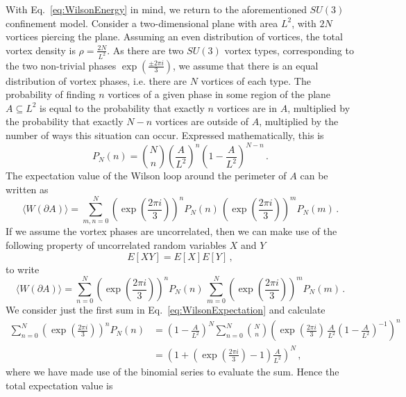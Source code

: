 With Eq.~\ref{eq:WilsonEnergy} in mind, we return to the aforementioned $SU(3)$ confinement model. Consider a two-dimensional plane with area $L^2$, with $2N$ vortices piercing the plane. Assuming an even distribution of vortices, the total vortex density is $\rho = \frac{2N}{L^2}$. As there are two $SU(3)$ vortex types, corresponding to the two non-trivial phases $\exp\left(\frac{\pm 2\pi i}{3}\right)$, we assume that there is an equal distribution of vortex phases, i.e. there are $N$ vortices of each type. The probability of finding $n$ vortices of a given phase in some region of the plane $A\subseteq L^2$ is equal to the probability that exactly $n$ vortices are in $A$, multiplied by the probability that exactly $N-n$ vortices are outside of $A$, multiplied by the number of ways this situation can occur. Expressed mathematically, this is
%
\begin{equation}
P_N(n) = {N\choose n} \left(\frac{A}{L^2}\right)^n \left(1-\frac{A}{L^2}\right)^{N-n}\, .
\end{equation}
%
The expectation value of the Wilson loop around the perimeter of $A$ can be written as
%
\begin{equation}
\langle W(\partial A)\rangle = \sum_{m,n = 0}^N \left(\exp\left(\frac{2\pi i}{3}\right)\right)^n P_N(n)\, \left(\exp\left(\frac{2\pi i}{3}\right)\right)^m P_N(m)\, .
\end{equation}
%
If we assume the vortex phases are uncorrelated, then we can make use of the following property of uncorrelated random variables $X$ and $Y$
%
\begin{equation}
E[XY] = E[X]E[Y]\, ,
\end{equation}
%
to write
%
\begin{equation}
\langle W(\partial A)\rangle = \sum_{n=0}^N \left(\exp\left(\frac{2\pi i}{3}\right)\right)^n P_N(n)\,\sum_{m=0}^N \left(\exp\left(\frac{2\pi i}{3}\right)\right)^m P_N(m)\, .
\label{eq:WilsonExpectation}
\end{equation}
%
We consider just the first sum in Eq.~\ref{eq:WilsonExpectation} and calculate
%
\begin{align*}
\sum_{n=0}^N \left(\exp\left(\frac{2\pi i}{3}\right)\right)^n P_N(n) & = \left(1-\frac{A}{L^2}\right)^{N}\sum_{n=0}^{N} {N\choose n} \left(\exp\left(\frac{2\pi i}{3}\right)\,\frac{A}{L^2}\left(1-\frac{A}{L^2}\right)^{-1}\right)^n\\
&=\left(1+\left(\exp\left(\frac{2\pi i}{3}\right) - 1\right)\frac{A}{L^2}\right)^N\, ,
\end{align*}
%
where we have made use of the binomial series to evaluate the sum. Hence the total expectation value is
